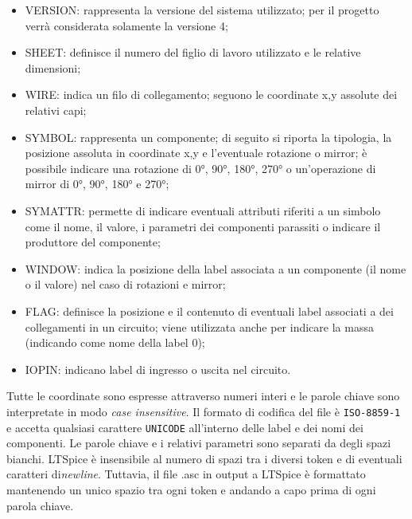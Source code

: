 \begin{itemize}
	\item VERSION: rappresenta la versione del sistema utilizzato; per il progetto verrà considerata solamente la versione 4;
	\item SHEET: definisce il numero del figlio di lavoro utilizzato e le relative dimensioni;
	\item WIRE: indica un filo di collegamento; seguono le coordinate x,y assolute dei relativi capi;
	\item SYMBOL: rappresenta un componente; di seguito si riporta la tipologia, la posizione assoluta in coordinate x,y e l'eventuale rotazione o mirror; è possibile indicare una rotazione di 0°, 90°, 180°, 270° o un'operazione di mirror di 0°, 90°, 180° e 270°;
	\item SYMATTR: permette di indicare eventuali attributi riferiti a un simbolo come il nome, il valore, i parametri dei componenti parassiti o indicare il produttore del componente;
	\item WINDOW: indica la posizione della label associata a un componente (il nome o il valore) nel caso di rotazioni e mirror;
	\item FLAG: definisce la posizione e il contenuto di eventuali label associati a dei collegamenti in un circuito; viene utilizzata anche per indicare la massa (indicando come nome della label 0);
	\item IOPIN: indicano label di ingresso o uscita nel circuito. 
\end{itemize}
Tutte le coordinate sono espresse attraverso numeri interi e le parole chiave sono interpretate in modo \textit{case insensitive}. Il formato di codifica del file è \texttt{ISO-8859-1} e accetta qualsiasi carattere \texttt{UNICODE} all'interno delle label e dei nomi dei componenti. Le parole chiave e i relativi parametri sono separati da degli spazi bianchi. LTSpice è insensibile al numero di spazi tra i diversi token e di eventuali caratteri di\textit{newline}. Tuttavia, il file .asc in output a LTSpice è formattato mantenendo un unico spazio tra ogni token e andando a capo prima di ogni parola chiave.

